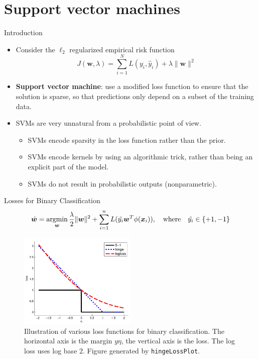 \documentclass[10pt,mathserif]{beamer}
\begin{document}
\section{Support vector machines}
\begin{frame}{Introduction}
\begin{itemize}
    \item Consider the $\ell_2$ regularized empirical risk function
    \begin{equation*}
        J(\bm{w}, \lambda) = \sum_{i=1}^NL(y_i, \hat{y}_i) + \lambda\|\bm{w}\|^2
    \end{equation*}
    \item \textbf{Support vector machine}: use a modified loss function to ensure that the solution is sparse, so that predictions only depend on a subset of the training data.
    \item SVMs are very unnatural from a probabilistic point of view.
    \begin{itemize}
        \item SVMs encode sparsity in the loss function rather than the prior.
        \item SVMs encode kernels by using an algorithmic trick, rather than being an explicit part of the model.
        \item SVMs do not result in probabilistic outputs (nonparametric).
    \end{itemize}
\end{itemize}
\end{frame}

\begin{frame}{Losses for Binary Classification}
\begin{equation*}
    \hat{\bm{w}} = \mathop{\rm argmin}_{\bm{w}} \frac{\lambda}{2}\|\bm{w}\|^2 + \sum_{i=1}^n L(\tilde{y_i} \bm{w}^T\phi(\bm{x}_i)), \quad \text{where} \quad \tilde{y_i}\in\{+1, -1\}
\end{equation*}
\begin{figure}[h]
\centering
\includegraphics[width=0.5\textwidth]{hingeLoss}
\caption{Illustration of various loss functions for binary classification. The horizontal axis is the margin $y\eta$, the vertical axis is the loss. The log loss uses log base 2. Figure generated by \texttt{hingeLossPlot}.}
\end{figure}
\end{frame}
\end{document}
